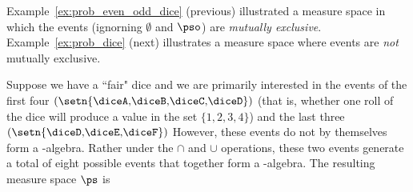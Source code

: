 Example~\ref{ex:prob_even_odd_dice} (previous) illustrated a
measure space in which the events (ignorning $\emptyset$ and $\pso$)
are {\em mutually exclusive}.
Example~\ref{ex:prob_dice} (next) illustrates a measure space
where events are {\em not} mutually exclusive.
\begin{example}
\label{ex:prob_dice}
Suppose we have a ``fair" dice and we are primarily interested in the
events of the first four
$\left(\setn{\text{\diceA,\diceB,\diceC,\diceD}}\right)$
(that is, whether one roll of the dice will produce
a value in the set $\{1,2,3,4\}$)
and the last three
$\left(\setn{\text{\diceD,\diceE,\diceF}}\right)$
However, these events do not by themselves form a \txsigma-algebra.
Rather under the $\cap$ and $\cup$ operations, these two events generate
a total of eight possible events that together form a \txsigma-algebra.
The resulting measure space $\ps$ is
\end{example}

